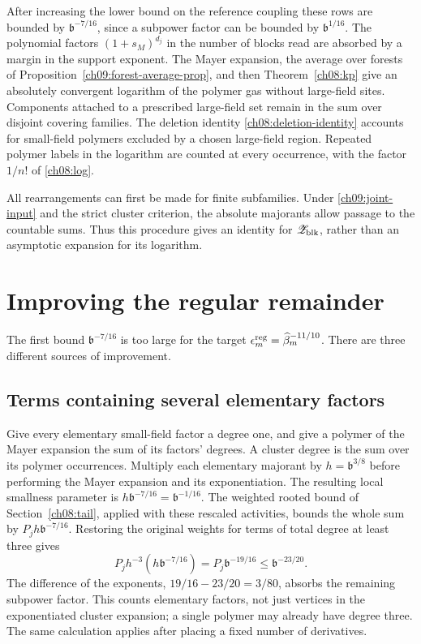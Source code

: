 After increasing the lower bound on the reference coupling these rows are bounded
by $\mathfrak b^{-7/16}$, since a subpower factor can be bounded
by $\mathfrak b^{1/16}$. The polynomial factors $(1+s_M)^{d_j}$ in the number of blocks read are absorbed by
a margin in the support exponent. The Mayer expansion, the average over forests of Proposition~\ref{ch09:forest-average-prop},
and then Theorem~\ref{ch08:kp} give an absolutely convergent
logarithm of the polymer gas without large-field sites. Components attached to
a prescribed large-field set remain in the sum over disjoint covering families.
The deletion identity \eqref{ch08:deletion-identity} accounts
for small-field polymers excluded by a chosen large-field region.
Repeated polymer labels in the logarithm are counted at every
occurrence, with the factor $1/n!$ of \eqref{ch08:log}.

All rearrangements can first be made for finite subfamilies.
Under \eqref{ch09:joint-input} and the strict cluster criterion,
the absolute majorants allow passage to the countable sums.
Thus this procedure gives an identity for $\mathscr Z_{\rm blk}$,
rather than an asymptotic expansion for its logarithm. 

\section{Improving the regular remainder}
\label{ch09:improvement}

The first bound $\mathfrak b^{-7/16}$ is too large for the
target $\epsilon_m^{\rm reg}=\widehat\beta_m^{-11/10}$.
There are three different sources of improvement.

\subsection{Terms containing several elementary factors}

Give every elementary small-field factor a degree one, and give
a polymer of the Mayer expansion the sum of its factors' degrees.
A cluster degree is the sum over its polymer occurrences.
Multiply each elementary majorant by
$h=\mathfrak b^{3/8}$ before performing the Mayer expansion and its exponentiation.
The resulting local smallness parameter is
$h\mathfrak b^{-7/16}=\mathfrak b^{-1/16}$.
The weighted rooted bound of
Section~\ref{ch08:tail}, applied with these rescaled activities,
bounds the whole sum by $P_jh\mathfrak b^{-7/16}$.
Restoring the original weights for terms of total degree at
least three gives
\begin{equation}
 P_jh^{-3}(h\mathfrak b^{-7/16})
       =P_j\mathfrak b^{-19/16}
       \le\mathfrak b^{-23/20}.
 \label{ch09:degree-gain}
\end{equation}
The difference of the exponents, $19/16-23/20=3/80$, absorbs the remaining subpower factor.
This counts elementary factors, not just vertices in the
exponentiated cluster expansion; a single polymer may already have
degree three. The same calculation applies after placing a
fixed number of derivatives.

